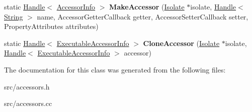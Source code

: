 \begin{DoxyCompactItemize}
\item 
\hypertarget{classv8_1_1internal_1_1_accessors_ac32befe4995c436c8d26edfd100a79cb}{}static \hyperlink{classv8_1_1internal_1_1_handle}{Handle}$<$ \hyperlink{classv8_1_1internal_1_1_accessor_info}{Accessor\+Info} $>$ {\bfseries Make\+Accessor} (\hyperlink{classv8_1_1internal_1_1_isolate}{Isolate} $\ast$isolate, \hyperlink{classv8_1_1internal_1_1_handle}{Handle}$<$ \hyperlink{classv8_1_1internal_1_1_string}{String} $>$ name, Accessor\+Getter\+Callback getter, Accessor\+Setter\+Callback setter, Property\+Attributes attributes)\label{classv8_1_1internal_1_1_accessors_ac32befe4995c436c8d26edfd100a79cb}

\item 
\hypertarget{classv8_1_1internal_1_1_accessors_a44b854a4d5c9fc44c37a9a2bafbd8d9e}{}static \hyperlink{classv8_1_1internal_1_1_handle}{Handle}$<$ \hyperlink{classv8_1_1internal_1_1_executable_accessor_info}{Executable\+Accessor\+Info} $>$ {\bfseries Clone\+Accessor} (\hyperlink{classv8_1_1internal_1_1_isolate}{Isolate} $\ast$isolate, \hyperlink{classv8_1_1internal_1_1_handle}{Handle}$<$ \hyperlink{classv8_1_1internal_1_1_executable_accessor_info}{Executable\+Accessor\+Info} $>$ accessor)\label{classv8_1_1internal_1_1_accessors_a44b854a4d5c9fc44c37a9a2bafbd8d9e}

\end{DoxyCompactItemize}


The documentation for this class was generated from the following files\+:\begin{DoxyCompactItemize}
\item 
src/accessors.\+h\item 
src/accessors.\+cc\end{DoxyCompactItemize}

